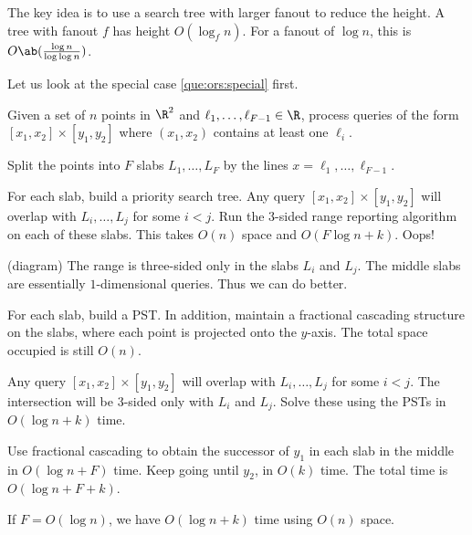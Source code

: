 The key idea is to use a search tree with larger fanout to reduce
the height.
A tree with fanout $f$ has height $O(\log_f n)$.
For a fanout of $\log n$, this is $O\ab(\frac{\log n}{\log \log n})$.

Let us look at the special case \cref{que:ors:special} first.
\begin{question*}
    Given a set of $n$ points in $\R^2$ and
    $\ell_1, \dots, \ell_{F-1} \in \R$,
    process queries of the form $[x_1, x_2] \times [y_1, y_2]$
    where $(x_1, x_2)$ contains at least one $\ell_i$.
\end{question*}
\begin{solution}
    Split the points into $F$ slabs $L_1, \dots, L_F$
    by the lines $x = \ell_1, \dots, \ell_{F-1}$.

    For each slab, build a priority search tree.
    Any query $[x_1, x_2] \times [y_1, y_2]$ will overlap with
    $L_i, \dots, L_j$ for some $i < j$.
    Run the 3-sided range reporting algorithm on each of these slabs.
    This takes $O(n)$ space and $O(F \log n + k)$.
    Oops!
\end{solution}
(diagram) The range is three-sided only in the slabs $L_i$ and $L_j$.
The middle slabs are essentially $1$-dimensional queries.
Thus we can do better.

\begin{solution}
    For each slab, build a PST.
    In addition, maintain a fractional cascading structure on the slabs,
    where each point is projected onto the $y$-axis.
    The total space occupied is still $O(n)$.

    Any query $[x_1, x_2] \times [y_1, y_2]$ will overlap with
    $L_i, \dots, L_j$ for some $i < j$.
    The intersection will be 3-sided only with $L_i$ and $L_j$.
    Solve these using the PSTs in $O(\log n + k)$ time.

    Use fractional cascading to obtain the successor of $y_1$ in each
    slab in the middle in $O(\log n + F)$ time.
    Keep going until $y_2$, in $O(k)$ time.
    The total time is $O(\log n + F + k)$.
\end{solution}
If $F = O(\log n)$, we have $O(\log n + k)$ time using $O(n)$ space.

